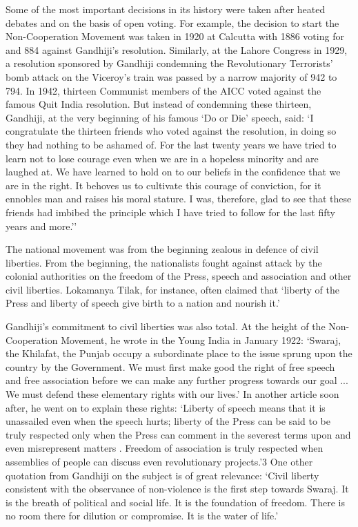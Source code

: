 \begin{multicols}{2}
Some of the most important decisions in its history were taken after heated debates and on the basis of open voting. For example, the decision to start the Non-Cooperation Movement was taken in 1920 at Calcutta with 1886 voting for and 884 against Gandhiji's resolution. Similarly, at the Lahore Congress in 1929, a resolution sponsored by Gandhiji condemning the Revolutionary Terrorists' bomb attack on the Viceroy's train was passed by a narrow majority of 942 to 794. In 1942, thirteen Communist members of the AICC voted against the famous Quit India resolution. But instead of condemning these thirteen, Gandhiji, at the very beginning of his famous `Do or Die' speech, said: `I congratulate the thirteen friends who voted against the resolution, in doing so they had nothing to be ashamed of. For the last twenty years we have tried to learn not to lose courage even when we are in a hopeless minority and are laughed at. We have learned to hold on to our beliefs in the confidence that we are in the right. It behoves us to cultivate this courage of conviction, for it ennobles man and raises his moral stature. I was, therefore, glad to see that these friends had imbibed the principle which I have tried to follow for the last fifty years and more.''

The national movement was from the beginning zealous in defence of civil liberties. From the beginning, the nationalists fought against attack by the colonial authorities on the freedom of the Press, speech and association and other civil liberties. Lokamanya Tilak, for instance, often claimed that `liberty of the Press and liberty of speech give birth to a nation and nourish it.'

Gandhiji's commitment to civil liberties was also total. At the height of the Non-Cooperation Movement, he wrote in the Young India in January 1922: `Swaraj, the Khilafat, the Punjab occupy a subordinate place to the issue sprung upon the country by the Government. We must first make good the right of free speech and free association before we can make any further progress towards our goal ... We must defend these elementary rights with our lives.' In another article soon after, he went on to explain these rights: `Liberty of speech means that it is unassailed even when the speech hurts; liberty of the Press can be said to be truly respected only when the Press can comment in the severest terms upon and even misrepresent matters . Freedom of association is truly respected when assemblies of people can discuss even revolutionary projects.'3 One other quotation from Gandhiji on the subject is of great relevance: `Civil liberty consistent with the observance of non-violence is the first step towards Swaraj. It is the breath of political and social life. It is the foundation of freedom. There is no room there for dilution or compromise. It is the water of life.'


\end{multicols}
